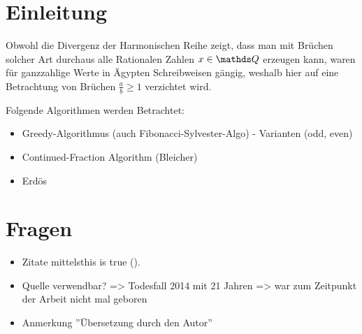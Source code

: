 \section{Einleitung}

Obwohl die Divergenz der Harmonischen Reihe zeigt, dass man mit Brüchen solcher Art durchaus alle Rationalen Zahlen $x \in \Q$ erzeugen kann, waren für ganzzahlige Werte in Ägypten Schreibweisen gängig, weshalb hier auf eine Betrachtung von Brüchen $\frac{a}{b} \geq 1$ verzichtet wird.

Folgende Algorithmen werden Betrachtet:
\begin{itemize}
	\item Greedy-Algorithmus (auch Fibonacci-Sylvester-Algo)
		\subitem - Varianten (odd, even)
	\item Continued-Fraction Algorithm (Bleicher)
	\item Erdös
\end{itemize}

\section*{Fragen}
\begin{itemize}
	\item Zitate mittelsthis is true (\cite{Beck2000}).
	\item Quelle \cite{Gong1992} verwendbar? => Todesfall 2014 mit 21 Jahren => war zum Zeitpunkt der Arbeit nicht mal geboren
	\item Anmerkung ''Übersetzung durch den Autor''
\end{itemize}